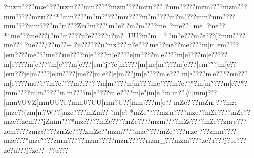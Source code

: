 {{{{{{{{{{{{{{{{{{{{{{{{{{{{{{{{{{{{{{{{{{{{{{{{{{{{{{{{{{{{{{{{{{{{{{{{{{{{{{{{{{{{{{{{{{{{{{{{{{{{{{{{{{{{{{{{{{{{{{{{{{{{{{{{{{{{{{{{{{{{{{{{{{{{{{{{{{{{{{{{{{{{{{{{{{{{{{{{{{{{{{{{{{{{{{{{{{{{{{{{{{{{{{{{{{{{{{{{{{{{{{{{{{{{{{{{{{{{{{{{{{{{{{{{{{{{{{{{{{{{{{{{{{{{{{{{{{{{{{{{{{{{{{{{{{{{{{{{{{{{{{{{{{{{{{{{{{{{{{{{{{{{{{{{{{{{{{{{{{{{{{{{{{{{{{{{{{{{{{{{{{{{{{{{{{{{{{{{{{{{{{{{{{{{{{{{{{{{{{{{{{{{{{{{{{{{{{{{{{{{{{{{{{{{{{{{{{{{{{{{{{{{{{{{{{{{{{{{{{{{{{{{{{{{{{{{{{{{{{{{{{{{{{{{{{{{{{{{{{{{{{{{{{{{{{{{{{{{{{{{{{{{{{{{{{{{{{{{{{{{{{{{{{{{{{{{{{{{{{{{{{{{{{{{{{{{{{{{{{{{{{{{{{{{{{{{{{{{{{{{{{{{{{{{{{{{{{{{{{{{{{{{{{{{{{{{{{{{{{{{{{{{{{{{{{{{{{{{{{{{{{{{{{{{{{{{{{{{{{{{{{{{{{{{{{{{{{{{{{{{{{{{{{{{{{{{{{{{{{{{{{{{{{{{{{{{{{{{{{{{{{{{{{{{{{{{{{{{{{{{{{{{{{{{{{{{{{{{{{{{{{{{{{{{{{{{{{{{{{{{{{{{{{{{{{{{{{{{{{{{{{{{{{{{{{{{{{{{{{{{{{{{{{{{{{{{{{{{{{{{{{{{{{{{{{{{{{{{{{{{{{{{{{{{{{{{{{{{{{{{{{{{{{{{{{{{{{{{{{{{{{{{{{{{{{{{{{{{{{{{{{{{{{{{{{{{{{{{{{{{{{{{{{{{{{{{{{{{{{{{{{{{{{{{{{{{{{{{{{{{{{{{{{{{{{{{{{{{{{{{{{{{{{{{{{{{{{{{{{{{{{{{{{{{{{{{{{{{{{{{{{{{{{{{{{{{{{{{{{{{{{{{{{{{{{{{{{{{{{{{{{{{{{{{{{{{{{{{{{{{{{{{{{{{{{{{{{{{{{{{{{{{{{{{{{{{{{{{{{{{{{{{{{{{{{{{{{{{{{{{{{{{{{{{{{{{{{{{{{{{{{{{{{{{{{{{{{{{{{{{{{{{{{{{{{{{{{{{{{{{{{{{{{{{{{{{{{{{{{{{{{{{{{{{{{{{{{{{{{{{{{{{{{{{{{{{{{{{{{{{{{{{{{{{{{{{{{{{{{{{{{{{{{{{{{{{{{{{{{{{{{{{{{{{{{{{{{{{{{{{{{{{{{{{{{{{{{{{{{{{{{{{{{{{{{{{{{{{{{{{{{{{{{{{{{{{{{{{{{{{{{{{{{{{{{{{{{{{{{{{{{{{{{{{{{{{{{{{{{{{{{{{{{{{{{{{{{{{{{{{{{{{{{{{{{{{{{{{{{{{{{{{{{{{{{{{{{{{{{{{{{{{{{{{{{{{{{{{{{{{{{{{{{{{{{{{{{{{{{{{{{{{{{{{{{{{{{{{{{{{{{{{{{{{{{{{{{{{{{{{{{?mzm????{mze*???{mzm???m{m?????mzm????{mzm???
?m{m?????mzm????mzm???m{m?????mzm??**?m{m????{m?m?????m{m????{m?m????{m?m(???{m{m    ?m{m????m{m????m{m????{m?m???Z{m?m???*{m?e?
 ?{m?m????{m{e  ?{m{e??*{m{e 
 ?m{e??**{m{e???{m{e???(?m?m ????u?e?????u?m?_UU?m?m_??m?e???m?e???(?m{m????m{e??*
?u{e???/?}?m??+?u?}?????u?mx???m?e???{m{e??{m{e??{m{e????{m[m
   {e{m????[e{m????{m{e???{m{e??{m{e????{m[e????{m[e????{e[m????{m[e????{m[e????{m[e?????m[e????{m[e????{m[e???{m[e???[e{m?j??{e[m????[m[m    {e[m????{m[e???[e{m???j{m[e??[e{m???j{e[m????[e[m????[m{e??[m[e??[e[m???j{m[e????{m[e???
{m[e????{m[e??*?{m{e???
{m[e????{m{e????{m?e?"??{m?e????m[m????{m[m???{m{e"???{m?e??*?{m[m????{m[e??*?[m{m????{m[m?????m[m????{m[e????{m[e???*{m[e"(  {m[e  ?{m[m??#:[m{mj???[m{mVUVZ[m{mUU?U?m{mU?UU[m{m?U??[m{mj???{m[e?? 
{mZe???{mZm
???{mze   
[mze? ?(zm[m?W??[mze????{mZm??
?{m[e?  *{mZe????{mzm????{mze??{mZe????{mZe??{mze??ze{m???jZm{m???*{mze????{mZe????{mZe????{mzm????{mZe????{mZe??zm[e???ze{m????zmze????zmZe????zmZe??{mzm????{mze????{mZe????{mze
???zm{m????{mze???*{mze????zm{m?????mzm?????mzm?????mzm_}???mzm????ze?u???j?u{e???ze?u???j?}ze???}?u??? }}}}}}}}}}}}}}}}}}}}}}}}}}}}}}}}}}}}}}}}}}}}}}}}}}}}}}}}}}}}}}}}}}}}}}}}}}}}}}}}}}}}}}}}}}}}}}}}}}}}}}}}}}}}}}}}}}}}}}}}}}}}}}}}}}}}}}}}}}}}}}}}}}}}}}}}}}}}}}}}}}}}}}}}}}}}}}}}}}}}}}}}}}}}}}}}}}}}}}}}}}}}}}}}}}}}}}}}}}}}}}}}}}}}}}}}}}}}}}}}}}}}}}}}}}}}}}}}}}}}}}}}}}}}}}}}}}}}}}}}}}}}}}}}}}}}}}}}}}}}}}}}}}}}}}}}}}}}}}}}}}}}}}}}}}}}}}}}}}}}}}}}}}}}}}}}}}}}}}}}}}}}}}}}}}}}}}}}}}}}}}}}}}}}}}}}}}}}}}}}}}}}}}}}}}}}}}}}}}}}}}}}}}}}}}}}}}}}}}}}}}}}}}}}}}}}}}}}}}}}}}}}}}}}}}}}}}}}}}}}}}}}}}}}}}}}}}}}}}}}}}}}}}}}}}}}}}}}}}}}}}}}}}}}}}}}}}}}}}}}}}}}}}}}}}}}}}}}}}}}}}}}}}}}}}}}}}}}}}}}}}}}}}}}}}}}}}}}}}}}}}}}}}}}}}}}}}}}}}}}}}}}}}}}}}}}}}}}}}}}}}}}}}}}}}}}}}}}}}}}}}}}}}}}}}}}}}}}}}}}}}}}}}}}}}}}}}}}}}}}}}}}}}}}}}}}}}}}}}}}}}}}}}}}}}}}}}}}}}}}}}}}}}}}}}}}}}}}}}}}}}}}}}}}}}}}}}}}}}}}}}}}}}}}}}}}}}}}}}}}}}}}}}}}}}}}}}}}}}}}}}}}}}}}}}}}}}}}}}}}}}}}}}}}}}}}}}}}}}}}}}}}}}}}}}}}}}}}}}}}}}}}}}}}}}}}}}}}}}}}}}}}}}}}}}}}}}}}}}}}}}}}}}}}}}}}}}}}}}}}}}}}}}}}}}}}}}}}}}}}}}}}}}}}}}}}}}}}}}}}}}}}}}}}}}}}}}}}}}}}}}}}}}}}}}}}}}}}}}}}}}}}}}}}}}}}}}}}}}}}}}}}}}}}}}}}}}}}}}}}}}}}}}}}}}}}}}}}}}}}}}}}}}}}}}}}}}}}}}}}}}}}}}}}}}}}}}}}}}}}}}}}}}}}}}}}}}}}}}}}}}}}}}}}}}}}}}}}}}}}}}}}}}}}}}}}}}}}}}}}}}}}}}}}}}}}}}}}}}}}}}}}}}}}}}}}}}}}}}}}}}}}}}}}}}}}}}}}}}}}}}}}}}}}}}}}}}}}}}}}}}}}}}}}}}}}}}}}}}}}}}}}}}}}}}}}}}}}}}}}}}}}}}}}}}}}}}}}}}}}}}}}}}}}}}}}}}}}}}}}}}}}}}}}}}}}}}}}}}}}}}}}}}}}}}}}}}}}}}}}}}}}}}}}}}}}}}}}}}}}}}}}}}}}}}}}}}}}}}}}}}}}}}}}}}}}}}}}}}}}}}}}}}}}}}}}}}}}}}}}}}}}}}}}}}}}}}}}}}}}}}}}}}}}}}}}}}}}}}}}}}}}}}}}}}}}}}}}}}}}}}}}}}}}}}}}}}}}}}}}}}}}}}}}}}}}}}}}}}}}}}}}}}}}}}}}}}}}}}}}}}}}}}}}}}}}}}}}}}}}}}}}}}}}}}}}}}}}}}}}}}}}}}}}}}}}}}}}}}}}}}}}}}}}}}}}}}}}}}}}}}}}}}}}}}}}}}}}}}}}}}}}}}}}}}}}}}}}}}}}}}}}}}}}}}}}}}}}}}}}}}}}}
